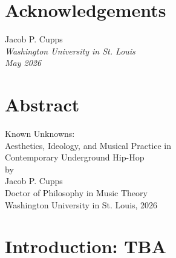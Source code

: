 \documentclass[12pt]{report}
\begin{document}
\thispagestyle{empty}

\frenchspacing %


\setcounter{page}{2}
    \tableofcontents
    \listoffigures
    \listoftables

    \chapter*{Acknowledgements}





\vspace{0.2cm}
\hfill{Jacob P. Cupps} \\ 
\noindent \textit{Washington University in St. Louis} \\
\noindent \textit{May 2026} \\

    \chapter*{Abstract}
    
    \begin{center}
        \Large Known Unknowns: \\
        \large Aesthetics, Ideology, and Musical Practice in \\ 
        \large Contemporary Underground Hip-Hop  \\
        \normalsize by \\
        Jacob P. Cupps \\
        Doctor of Philosophy in Music Theory \\
        
        Washington University in St. Louis, 2026 \\
    \end{center}
    

    \normalsize



\chapter{Introduction: TBA}

\end{document}
